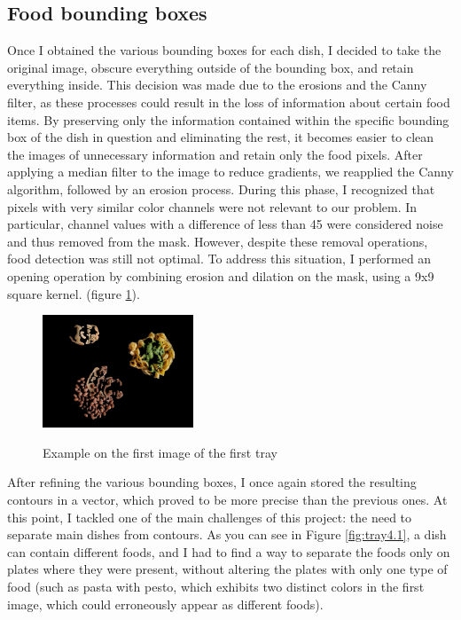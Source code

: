 \documentclass[
	a4paper, %
	10pt, %
	unnumberedsections, %
	twoside, %
]{LTJournalArticle}
\begin{document}
\subsection{Food bounding boxes}
Once I obtained the various bounding boxes for each dish, I decided to take the original image, obscure everything outside of the bounding box, and retain everything inside. This decision was made due to the erosions and the Canny filter, as these processes could result in the loss of information about certain food items. By preserving only the information contained within the specific bounding box of the dish in question and eliminating the rest, it becomes easier to clean the images of unnecessary information and retain only the food pixels.
After applying a median filter to the image to reduce gradients, we reapplied the Canny algorithm, followed by an erosion process. During this phase, I recognized that pixels with very similar color channels were not relevant to our problem. In particular, channel values with a difference of less than 45 were considered noise and thus removed from the mask.
However, despite these removal operations, food detection was still not optimal. To address this situation, I performed an opening operation by combining erosion and dilation on the mask, using a 9x9 square kernel. (figure \ref{test_2}).\\

\begin{figure}
    \centering
    {\includegraphics[width=0.4\textwidth]{Images/Test_3.png}} 
    \caption{Example on the first image of the first tray}
    \label{test_2}
\end{figure}

After refining the various bounding boxes, I once again stored the resulting contours in a vector, which proved to be more precise than the previous ones. At this point, I tackled one of the main challenges of this project: the need to separate main dishes from contours. As you can see in Figure \ref{fig:tray4.1}, a dish can contain different foods, and I had to find a way to separate the foods only on plates where they were present, without altering the plates with only one type of food (such as pasta with pesto, which exhibits two distinct colors in the first image, which could erroneously appear as different foods).
\end{document}
